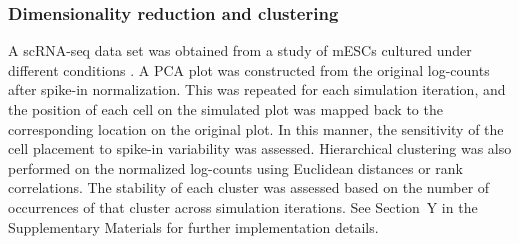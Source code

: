 \documentclass{article}
\begin{document}
\subsubsection{Dimensionality reduction and clustering}
A scRNA-seq data set was obtained from a study of mESCs cultured under different conditions \cite{kolod2015single}.
A PCA plot was constructed from the original log-counts after spike-in normalization.
This was repeated for each simulation iteration, and the position of each cell on the simulated plot was mapped back to the corresponding location on the original plot.
In this manner, the sensitivity of the cell placement to spike-in variability was assessed.
Hierarchical clustering was also performed on the normalized log-counts using Euclidean distances or rank correlations.
The stability of each cluster was assessed based on the number of occurrences of that cluster across simulation iterations.
See Section~Y in the Supplementary Materials for further implementation details.

{\small


}
\end{document}
